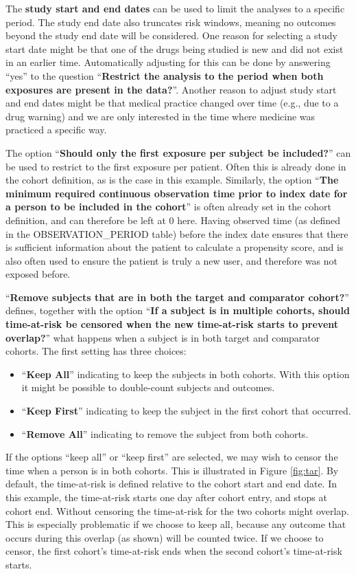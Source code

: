 \documentclass[11pt]{book}
\providecommand{\tightlist}{%
  \setlength{\itemsep}{0pt}\setlength{\parskip}{0pt}}
\theoremstyle{definition}
\theoremstyle{definition}
\theoremstyle{definition}
\theoremstyle{remark}
\begin{document}
The \textbf{study start and end dates} can be used to limit the analyses to a specific period. The study end date also truncates risk windows, meaning no outcomes beyond the study end date will be considered. One reason for selecting a study start date might be that one of the drugs being studied is new and did not exist in an earlier time. Automatically adjusting for this can be done by answering ``yes'' to the question ``\textbf{Restrict the analysis to the period when both exposures are present in the data?}''. Another reason to adjust study start and end dates might be that medical practice changed over time (e.g., due to a drug warning) and we are only interested in the time where medicine was practiced a specific way.

The option ``\textbf{Should only the first exposure per subject be included?}'' can be used to restrict to the first exposure per patient. Often this is already done in the cohort definition, as is the case in this example. Similarly, the option ``\textbf{The minimum required continuous observation time prior to index date for a person to be included in the cohort}'' is often already set in the cohort definition, and can therefore be left at 0 here. Having observed time (as defined in the OBSERVATION\_PERIOD table) before the index date ensures that there is sufficient information about the patient to calculate a propensity score, and is also often used to ensure the patient is truly a new user, and therefore was not exposed before.

``\textbf{Remove subjects that are in both the target and comparator cohort?}'' defines, together with the option ``\textbf{If a subject is in multiple cohorts, should time-at-risk be censored when the new time-at-risk starts to prevent overlap?}'' what happens when a subject is in both target and comparator cohorts. The first setting has three choices:

\begin{itemize}
\tightlist
\item
  ``\textbf{Keep All}'' indicating to keep the subjects in both cohorts. With this option it might be possible to double-count subjects and outcomes.
\item
  ``\textbf{Keep First}'' indicating to keep the subject in the first cohort that occurred.
\item
  ``\textbf{Remove All}'' indicating to remove the subject from both cohorts.
\end{itemize}

If the options ``keep all'' or ``keep first'' are selected, we may wish to censor the time when a person is in both cohorts. This is illustrated in Figure \ref{fig:tar}. By default, the time-at-risk is defined relative to the cohort start and end date. In this example, the time-at-risk starts one day after cohort entry, and stops at cohort end. Without censoring the time-at-risk for the two cohorts might overlap. This is especially problematic if we choose to keep all, because any outcome that occurs during this overlap (as shown) will be counted twice. If we choose to censor, the first cohort's time-at-risk ends when the second cohort's time-at-risk starts.
\end{document}
